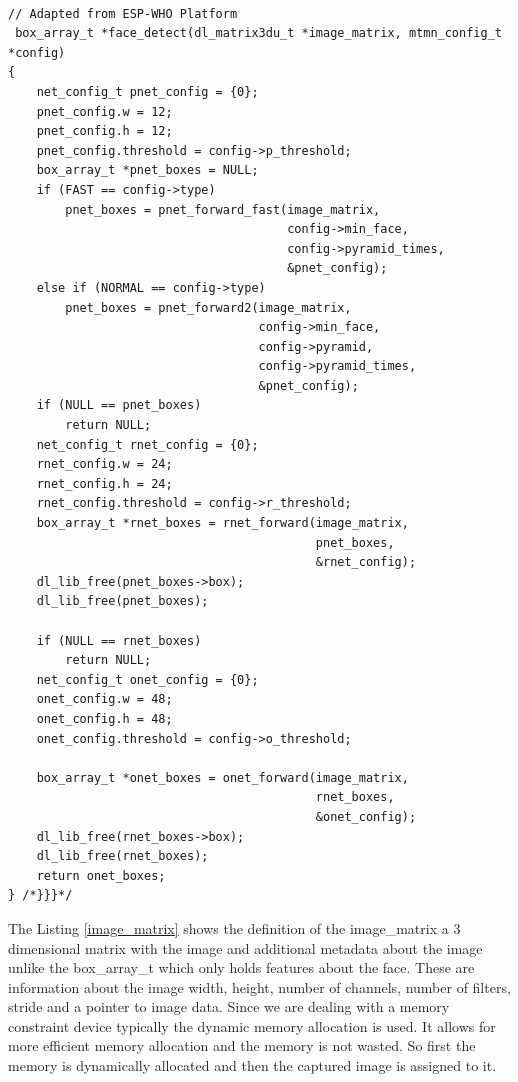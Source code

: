 \begin{lstlisting}[caption={Face detection API},label=face_detect, captionpos=b]

// Adapted from ESP-WHO Platform
 box_array_t *face_detect(dl_matrix3du_t *image_matrix, mtmn_config_t *config)
{ 
    net_config_t pnet_config = {0};
    pnet_config.w = 12;
    pnet_config.h = 12;
    pnet_config.threshold = config->p_threshold;
    box_array_t *pnet_boxes = NULL;
    if (FAST == config->type)
        pnet_boxes = pnet_forward_fast(image_matrix,
                                       config->min_face,
                                       config->pyramid_times,
                                       &pnet_config);
    else if (NORMAL == config->type)
        pnet_boxes = pnet_forward2(image_matrix,
                                   config->min_face,
                                   config->pyramid,
                                   config->pyramid_times,
                                   &pnet_config);
    if (NULL == pnet_boxes)
        return NULL;
    net_config_t rnet_config = {0};
    rnet_config.w = 24;
    rnet_config.h = 24;
    rnet_config.threshold = config->r_threshold;
    box_array_t *rnet_boxes = rnet_forward(image_matrix,
                                           pnet_boxes,
                                           &rnet_config);
    dl_lib_free(pnet_boxes->box);
    dl_lib_free(pnet_boxes);

    if (NULL == rnet_boxes)
        return NULL;
    net_config_t onet_config = {0};
    onet_config.w = 48;
    onet_config.h = 48;
    onet_config.threshold = config->o_threshold;

    box_array_t *onet_boxes = onet_forward(image_matrix,
                                           rnet_boxes,
                                           &onet_config);
    dl_lib_free(rnet_boxes->box);
    dl_lib_free(rnet_boxes);
    return onet_boxes;
} /*}}}*/
\end{lstlisting}






The Listing \ref{image_matrix} shows the definition of the image\_matrix a 3 dimensional matrix with the image and additional metadata about the image unlike the {\selectfont box\_array\_t} which only holds features about the face. These are information about the image width, height, number of channels, number of filters, stride and a pointer to image data. Since we are dealing with a memory constraint device typically the dynamic memory allocation is used. It allows for more efficient memory allocation and the memory is not wasted. So first the memory is dynamically allocated and then the captured image is assigned to it. 




